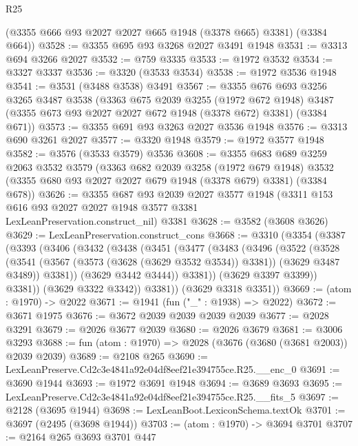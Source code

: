 \begin{lexlean}{R25}
\begin{coremodule}
      (@3355 @666 @93 @2027 @2027 @665 @1948 (@3378 @665) @3381)
      (@3384 @664))
@3528 := @3355 @695 @93 @3268 @2027 @3491 @1948
@3531 := @3313 @694 @3266 @2027
@3532 := @759 @3335
@3533 := @1972 @3532
@3534 := @3327 @3337
@3536 := @3320 (@3533 @3534)
@3538 := @1972 @3536 @1948
@3541 := @3531 (@3488 @3538) @3491
@3567 := @3355
    @676
    @693
    @3256
    @3265
    @3487
    @3538
    (@3363
      @675
      @2039
      @3255
      (@1972 @672 @1948)
      @3487
      (@3355 @673 @93 @2027 @2027 @672 @1948 (@3378 @672) @3381)
      (@3384 @671))
@3573 := @3355 @691 @93 @3263 @2027 @3536 @1948
@3576 := @3313 @690 @3261 @2027
@3577 := @3320 @1948
@3579 := @1972 @3577 @1948
@3582 := @3576 (@3533 @3579) @3536
@3608 := @3355
    @683
    @689
    @3259
    @2063
    @3532
    @3579
    (@3363
      @682
      @2039
      @3258
      (@1972 @679 @1948)
      @3532
      (@3355 @680 @93 @2027 @2027 @679 @1948 (@3378 @679) @3381)
      (@3384 @678))
@3626 := @3355
    @687
    @93
    @2039
    @2027
    @3577
    @1948
    (@3311 @153 @616 @93 @2027 @2027 @1948 @3577 @3381 LexLeanPreservation.construct_nil)
    @3381
@3628 := @3582 (@3608 @3626)
@3629 := LexLeanPreservation.construct_cons
@3668 := @3310
    (@3354
      (@3387
        (@3393
          (@3406
            (@3432
              (@3438
                (@3451
                  (@3477
                    (@3483
                      (@3496
                        (@3522
                          (@3528
                            (@3541
                              (@3567 (@3573 (@3628 (@3629 @3532 @3534)) @3381))
                              (@3629 @3487 @3489))
                            @3381))
                        (@3629 @3442 @3444))
                      @3381))
                  (@3629 @3397 @3399))
                @3381))
            (@3629 @3322 @3342))
          @3381))
      (@3629 @3318 @3351))
@3669 := (atom : @1970) -> @2022
@3671 := @1941 (fun ("_" : @1938) => @2022)
@3672 := @3671 @1975
@3676 := @3672 @2039 @2039 @2039 @2039
@3677 := @2028 @3291
@3679 := @2026 @3677 @2039
@3680 := @2026 @3679
@3681 := @3006 @3293
@3688 := fun (atom : @1970) => @2028 (@3676 (@3680 (@3681 @2003)) @2039 @2039)
@3689 := @2108 @265
@3690 := LexLeanPreserve.Cd2c3e4841a92e04df8eef21e394755ce.R25.__enc_0
@3691 := @3690 @1944
@3693 := @1972 @3691 @1948
@3694 := @3689 @3693
@3695 := LexLeanPreserve.Cd2c3e4841a92e04df8eef21e394755ce.R25.__fits_5
@3697 := @2128 (@3695 @1944)
@3698 := LexLeanBoot.LexiconSchema.textOk
@3701 := @3697 (@2495 (@3698 @1944))
@3703 := (atom : @1970) -> @3694 @3701
@3707 := @2164 @265 @3693 @3701 @447

\end{coremodule}
\end{lexlean}
